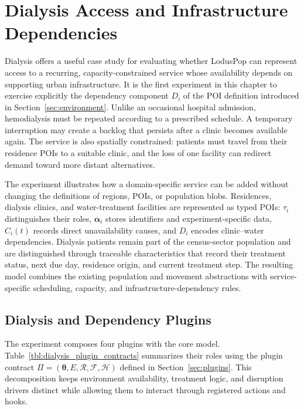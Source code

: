 \section{Dialysis Access and Infrastructure Dependencies}
\label{sec:results_dialysis}

Dialysis offers a useful case study for evaluating whether LodusPop can represent access to a recurring, capacity-constrained service whose availability depends on supporting urban infrastructure. It is the first experiment in this chapter to exercise explicitly the dependency component $D_i$ of the POI definition introduced in Section~\ref{sec:environment}. Unlike an occasional hospital admission, hemodialysis must be repeated according to a prescribed schedule. A temporary interruption may create a backlog that persists after a clinic becomes available again. The service is also spatially constrained: patients must travel from their residence POIs to a suitable clinic, and the loss of one facility can redirect demand toward more distant alternatives.


The experiment illustrates how a domain-specific service can be added without changing the definitions of regions, POIs, or population blobs. Residences, dialysis clinics, and water-treatment facilities are represented as typed POIs: $\tau_i$ distinguishes their roles, $\bm{\alpha}_i$ stores identifiers and experiment-specific data, $C_i(t)$ records direct unavailability causes, and $D_i$ encodes clinic--water dependencies. Dialysis patients remain part of the census-sector population and are distinguished through traceable characteristics that record their treatment status, next due day, residence origin, and current treatment step. The resulting model combines the existing population and movement abstractions with service-specific scheduling, capacity, and infrastructure-dependency rules.

\subsection{Dialysis and Dependency Plugins}
\label{sec:dialysis_plugin}

The experiment composes four plugins with the core model. Table~\ref{tbl:dialysis_plugin_contracts} summarizes their roles using the plugin contract $\Pi=(\bm{\theta},E,\mathcal{R},\mathcal{F},\mathcal{H})$ defined in Section~\ref{sec:plugins}. This decomposition keeps environment availability, treatment logic, and disruption drivers distinct while allowing them to interact through registered actions and hooks.

